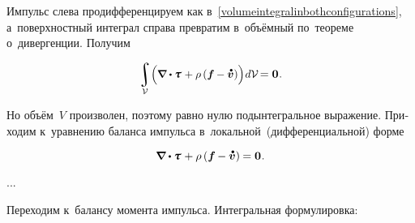 \begin{otherlanguage}{russian}
\vspace{-0.5em} Импульс слева продифференцируем как в~\eqref{volumeintegralinbothconfigurations}, а~поверхностный интеграл справа превратим в~объёмный по~теореме о~дивергенции. Получим

\nopagebreak\vspace{-0.1em}\begin{equation*}
\scalebox{0.96}[0.96]{$\displaystyle\integral\displaylimits_{\mathcal{V}} \hspace{-0.4ex} \left(^{\mathstrut} \hspace{-0.16ex} \boldnabla \dotp \cauchystress \hspace{0.15ex} + \rho \left( \bm{f} \hspace{-0.1ex} - \mathdotabove{\bm{v}} \right) \right) \hspace{-0.25ex} d\mathcal{V}$} \hspace{-0.32ex} = \bm{0} \hspace{0.1ex}.
\end{equation*}

\vspace{-0.25em}\noindent Но объём~$V$ произволен, поэтому равно нулю подынтегральное выражение. Приходим к~уравнению баланса импульса в~локальной~(дифференциальной) форме

\nopagebreak\vspace{-0.1em}\begin{equation}\label{balanceoftranslationalmomentum.local}
\boldnabla \dotp \cauchystress \hspace{0.15ex} + \rho \left( \bm{f} \hspace{-0.1ex} - \mathdotabove{\bm{v}} \right) \hspace{-0.1ex}
= \bm{0} \hspace{.1ex}.
\end{equation}

...

Переходим к~балансу момента импульса. Интегральная формулировка:


\end{otherlanguage}
